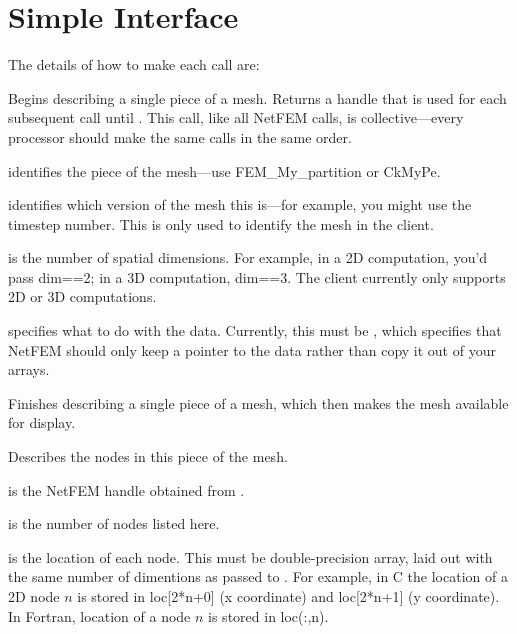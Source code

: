 \documentclass[10pt]{article}
\begin{document}
\section{Simple Interface}
The details of how to make each call are:


Begins describing a single piece of a mesh.  Returns a handle
that is used for each subsequent call until .  
This call, like all NetFEM calls, is collective---every processor 
should make the same calls in the same order.

 identifies the piece of the mesh---use FEM\_My\_partition
or CkMyPe.

 identifies which version of the mesh this is---for example,
you might use the timestep number.  This is only used to identify the
mesh in the client.

 is the number of spatial dimensions.  For example, in a 2D
computation, you'd pass dim==2; in a 3D computation, dim==3.
The client currently only supports 2D or 3D computations.

 specifies what to do with the data.  Currently, this
must be , which specifies that NetFEM should 
only keep a pointer to the data rather than copy it out of your
arrays.



Finishes describing a single piece of a mesh, which 
then makes the mesh available for display.



Describes the nodes in this piece of the mesh.

 is the NetFEM handle obtained from .

 is the number of nodes listed here.

 is the location of each node.  This must be double-precision
array, laid out with the same number of dimentions as passed to 
.  For example, in C the location of a 2D
node $n$ is stored in loc[2*n+0] (x coordinate) and loc[2*n+1]
(y coordinate).  In Fortran, location of a node $n$ is stored 
in loc(:,n).
\end{document}
